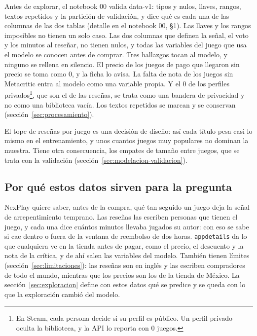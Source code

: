 Antes de explorar, el notebook 00 valida data-v1: tipos y nulos, llaves, rangos, textos repetidos
y la partición de validación, y dice qué es cada una de las \cifraColumnasDiccionario{} columnas de
las dos tablas (detalle en el notebook 00, §1). Las llaves y los rangos imposibles
no tienen un solo caso. Las dos columnas que definen la señal, el voto y los minutos al reseñar,
no tienen nulos, y todas las variables del juego que usa el modelo se conocen antes de comprar.
Tres hallazgos tocan al modelo, y ninguno se rellena en silencio. El precio de los
\cifraPagoSinPrecioEntrenamiento{} juegos de pago que llegaron sin precio se toma como 0, y la
ficha lo avisa. La falta de nota de los \cifraSinNotaEntrenamiento{} juegos sin Metacritic entra
al modelo como una variable propia. Y el 0 de los perfiles privados\footnote{En Steam, cada
persona decide si su perfil es público. Un perfil privado oculta la biblioteca, y la API lo
reporta con 0 juegos.}, que son el \cifraPrivadosEntrenamientoPorResena{} de las reseñas, se trata
como una bandera de privacidad y no como una biblioteca vacía. Los textos repetidos se marcan y se
conservan (sección~\ref{sec:procesamiento}).

El tope de \cifraTopeIngesta{} reseñas por juego es una decisión de diseño: así cada título pesa
casi lo mismo en el entrenamiento, y unos cuantos juegos muy populares no dominan la muestra.
Tiene otra consecuencia, los empates de tamaño entre juegos, que se trata con la validación
(sección~\ref{sec:modelacion-validacion}).

\subsection{Por qué estos datos sirven para la pregunta}\label{sec:datos-relevancia}

NexPlay quiere saber, antes de la compra, qué tan seguido un juego deja la señal de
arrepentimiento temprano. Las reseñas las escriben personas que tienen el juego, y cada
una dice cuántos minutos llevaba jugados su autor: con eso se sabe si cae dentro o fuera de la
ventana de reembolso de dos horas. \texttt{appdetails} da lo que cualquiera ve en la tienda antes
de pagar, como el precio, el descuento y la nota de la crítica, y de ahí salen las variables del
modelo. También tienen límites (sección~\ref{sec:limitaciones}): las reseñas son en inglés y las
escriben compradores de todo el mundo, mientras que los precios son los de la tienda de México.
La sección~\ref{sec:exploracion} define con estos datos qué se predice y se queda con lo que la
exploración cambió del modelo.
